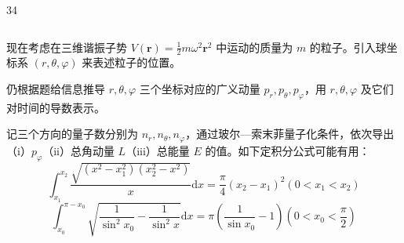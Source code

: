 \begin{problem}[2026年博知汇BWPhO][玻尔—索末菲量子化条件]{34}
\begin{subproblem}
\begin{subsubproblem}
\begin{equation}
            \end{equation}
        \end{subsubproblem}
    \end{subproblem}
    \begin{subproblem}
        现在考虑在三维谐振子势 $V(\pmb{r}) = \frac{1}{2} m\omega^2\pmb{r}^2$ 中运动的质量为 $m$ 的粒子。引入球坐标系 $(r,\theta ,\varphi)$ 来表述粒子的位置。
        \begin{subsubproblem}
            仍根据题给信息推导 $r, \theta, \varphi$ 三个坐标对应的广义动量 $p_r, p_\theta, p_\varphi$，用 $r, \theta, \varphi$ 及它们对时间的导数表示。
        \end{subsubproblem}
        \begin{subsubproblem}
            记三个方向的量子数分别为 $n_r, n_\theta, n_\varphi$，通过玻尔—索末菲量子化条件，依次导出（i）$p_\varphi$（ii）总角动量 $L$（iii）总能量 $E$ 的值。如下定积分公式可能有用：
            \begin{equation}
                \int_ {x _ {1}} ^ {x _ {2}} \frac {\sqrt {(x ^ {2} - x _ {1} ^ {2}) (x _ {2} ^ {2} - x ^ {2})}}{x} \mathrm{d} x = \frac {\pi}{4} (x _ {2} - x _ {1}) ^ {2} (0 <   x _ {1} <   x _ {2})
            \end{equation}
            \begin{equation}
                \int_ {x _ {0}} ^ {\pi - x _ {0}} \sqrt {\frac {1}{\sin^ {2} x _ {0}} - \frac {1}{\sin^ {2} x}} \mathrm{d} x = \pi \left(\frac {1}{\sin x _ {0}} - 1\right) \left(0 <   x _ {0} <   \frac {\pi}{2}\right)
            \end{equation}
        \end{subsubproblem}
    \end{subproblem}
\end{problem}
